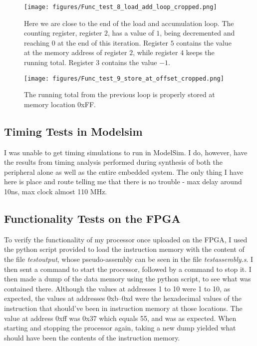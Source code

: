 \documentclass[11pt]{article}
\begin{document}
\begin{figure}[ht]
  \centering
  \texttt{[image: figures/Func\_test\_8\_load\_add\_loop\_cropped.png]}
  \caption{\label{fig:ldi} Here we are close to the end of the load
    and accumulation loop. The counting register, register $2$, has a
    value of $1$, being decremented and reaching $0$ at the end of this
    iteration. Register $5$ contains the value at the memory address of
    register $2$, while register $4$ keeps the running total. Register $3$
    contains the value $-1$.}
\end{figure}

\begin{figure}[ht]
  \centering
  \texttt{[image: figures/Func\_test\_9\_store\_at\_offset\_cropped.png]}
  \caption{\label{fig:ldi} The running total from the previous loop is
    properly stored at memory location 0xFF.}
\end{figure}

\subsection{Timing Tests in Modelsim}
\label{subsec:timingtestsim}
I was unable to get timing simulations to run in ModelSim. I do, however, have the results from timing analysis performed during synthesis of both the peripheral alone as well as the entire embedded system. The only thing I have here is place and route telling me that there is no trouble - max delay around 10ns, max clock almost 110 MHz.

\subsection{Functionality Tests on the FPGA}
\label{subsec:functestfpga}
To verify the functionality of my processor once uploaded on the FPGA,
I used the python script provided to load the instruction memory with
the content of the file {\em testoutput}, whose pseudo-assembly can be
seen in the file {\em testassembly.s}. I then sent a command to start
the processor, followed by a command to stop it. I then made a dump of
the data memory using the python script, to see what was contained
there. Although the values at addresses 1 to 10 were 1 to 10, as
expected, the values at addresses 0xb--0xd were the hexadecimal values
of the instruction that should've been in instruction memory at those
locations. The value at address 0xff was 0x37 which equals 55, and was
as expected. When starting and stopping the processor again, taking a
new dump yielded what should have been the contents of the instruction
memory. 
\end{document}
